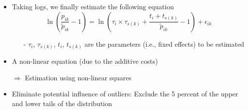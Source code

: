 \documentclass[10 pt,Helvetica, french]{beamer}
\begin{document}

\begin{frame}
\begin{itemize}
\item Taking logs, we finally estimate the following equation
\footnotesize
\begin{equation}
\ln\left(\frac{p_{ik}}{\widetilde{p}_{ik}}-1 \right)= \ln \left(\tau_{i} \times \tau_{s(k)}+\frac{t_{i} + t_{s(k)}}{\widetilde{p}_{ik}}-1 \right) + \epsilon_{ik} \label{eq:est_equation}
\end{equation}
\normalsize
\begin{itemize}
\item[-] $\tau_i$, $\tau_{s(k)}$, $t_i$, $t_{s(k)}$ are the parameters (i.e., fixed effects) to be estimated \vspace{0.1cm}
\pause
\end{itemize}
\item A non-linear equation (due to the additive costs)  \vspace{0.1cm}
\item[$\Rightarrow$] Estimation using non-linear squares \vspace{0.1cm}
\pause
\item Eliminate potential influence of outliers: Exclude the 5 percent of the upper and lower tails of the distribution
\end{itemize}
\end{frame}

\end{document}
